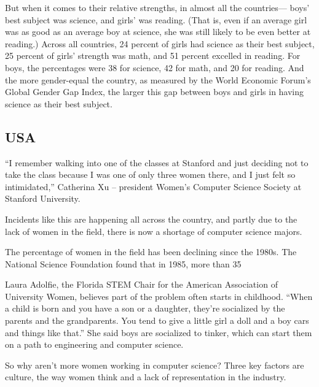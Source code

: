 	But when it comes to their relative strengths, in almost all the countries— boys’ best subject was science, and girls’ was reading. (That is, even if an average girl was as good as an average boy at science, she was still likely to be even better at reading.) Across all countries, 24 percent of girls had science as their best subject, 25 percent of girls’ strength was math, and 51 percent excelled in reading. For boys, the percentages were 38 for science, 42 for math, and 20 for reading. And the more gender-equal the country, as measured by the World Economic Forum’s Global Gender Gap Index, the larger this gap between boys and girls in having science as their best subject.
	
	\subsection{USA}
	
	“I remember walking into one of the classes at Stanford and just deciding not to take the class because I was one of only three women there, and I just felt so intimidated,”
	Catherina Xu – president Women’s Computer Science Society at Stanford University.
	
	Incidents like this are happening all across the country, and partly due to the lack of women in the field, there is now a shortage of computer science majors.
	
	The percentage of women in the field has been declining since the 1980s. The National Science Foundation found that in 1985, more than 35%
	
	Laura Adolfie, the Florida STEM Chair for the American Association of University Women, believes part of the problem often starts in childhood. “When a child is born and you have a son or a daughter, they’re socialized by the parents and the grandparents. You tend to give a little girl a doll and a boy cars and things like that.” She said boys are socialized to tinker, which can start them on a path to engineering and computer science.
	
	So why aren’t more women working in computer science? 
	Three key factors are culture, the way women think and a lack of representation in the industry.
	
	
